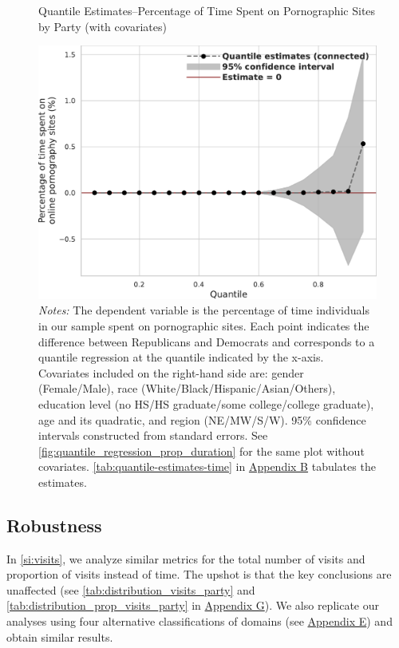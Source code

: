 \documentclass[12pt,twoside]{article}
\begin{document}
\begin{figure}[!ht]
	\centering
	\caption{Quantile Estimates--Percentage of Time Spent on Pornographic Sites by Party (with covariates)}
	\includegraphics[width=.7\linewidth]{figs/quantile_reg_covariates_proportion_duration_adult.pdf}
	\caption*{\footnotesize \emph{Notes:} 
		The dependent variable is the percentage of time individuals in our sample spent on pornographic sites.
		Each point indicates the difference between Republicans and Democrats and corresponds to a quantile regression at the quantile indicated by the x-axis.
		Covariates included on the right-hand side are: gender (Female/Male), race (White/Black/Hispanic/Asian/Others), education level (no HS/HS graduate/some college/college graduate), age and its quadratic, and region (NE/MW/S/W).
		95\% confidence intervals constructed from standard errors.
		See \cref{fig:quantile_regression_prop_duration} for the same plot without covariates.
        \cref{tab:quantile-estimates-time} in \hyperref[sm:smB]{Appendix B} tabulates the estimates.
	}
	\label{fig:quantile_regression_prop_duration_covariates}
\end{figure}

\subsection{Robustness}
In \ref{si:visits}, we analyze similar metrics for the total number of visits and proportion of visits instead of time. The upshot is that the key conclusions are unaffected (see \cref{tab:distribution_visits_party} and \cref{tab:distribution_prop_visits_party} in \hyperref[sm:smG]{Appendix G}). We also replicate our analyses using four alternative classifications of domains (see \hyperref[sm:smE]{Appendix E}) and obtain similar results. 
\end{document}

